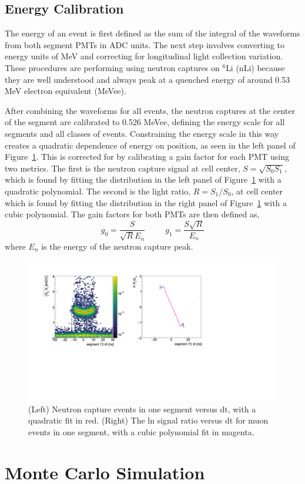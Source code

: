 \subsection{Energy Calibration}

The energy of an event is first defined as the sum of the integral of the waveforms from both segment PMTs in ADC units. 
The next step involves converting to energy units of MeV and correcting for longitudinal light collection variation.
These procedures are performing using neutron captures on $^6$Li (nLi) because they are well understood and always peak at a quenched energy of around 0.53 MeV electron equivalent (MeVee). 

After combining the waveforms for all events, the neutron captures at the center of the segment are calibrated to 0.526 MeVee, defining the energy scale for all segments and all classes of events. 
Constraining the energy scale in this way creates a quadratic dependence of energy on position, as seen in the left panel of Figure~\ref{fig:ecorrection}.
This is corrected for by calibrating a gain factor for each PMT using two metrics. 
The first is the neutron capture signal at cell center, $S = \sqrt{S_0S_1}$, which is found by fitting the distribution in the left panel of Figure~\ref{fig:ecorrection} with a quadratic polynomial.
The second is the light ratio, $R = S_1/S_0$, at cell center which is found by fitting the distribution in the right panel of Figure~\ref{fig:ecorrection} with a cubic polynomial.
The gain factors for both PMTs are then defined as, 
\begin{equation}
	g_0 = \frac{S}{\sqrt{R}E_n} ~~~~~~~~~~~ g_1 = \frac{S\sqrt{R}}{E_n}
\end{equation}
where $E_n$ is the energy of the neutron capture peak. 


\begin{figure}[t]
	\centering
	\includegraphics[width=0.9\linewidth]{tex/5-analysis-images/ECorrection}
	\caption[Energy position dependence]{(Left) Neutron capture events in one segment versus dt, with a quadratic fit in red. (Right) The ln signal ratio versus dt for muon events in one segment, with a cubic polynomial fit in magenta.}
	\label{fig:ecorrection}
\end{figure}


\section{Monte Carlo Simulation}





